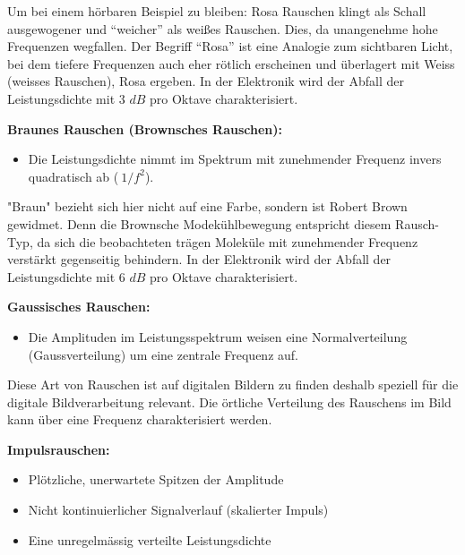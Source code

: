 Um bei einem hörbaren Beispiel zu bleiben: Rosa Rauschen klingt als Schall ausgewogener und ``weicher'' als weißes Rauschen. Dies, da unangenehme hohe Frequenzen wegfallen. Der Begriff ``Rosa'' ist eine Analogie zum sichtbaren Licht, bei dem tiefere Frequenzen auch eher rötlich erscheinen und überlagert mit Weiss (weisses Rauschen), Rosa ergeben. In der Elektronik wird der Abfall der Leistungsdichte mit 3 $ dB $ pro Oktave charakterisiert.

\begin{definition}{\bf Braunes Rauschen (Brownsches Rauschen):}
	\begin{itemize}
		\item Die Leistungsdichte nimmt im Spektrum mit zunehmender Frequenz invers quadratisch ab ($ ~1/f^2 $).
	\end{itemize}
\end{definition}


"Braun" bezieht sich hier nicht auf eine Farbe, sondern ist Robert Brown gewidmet. Denn die Brownsche Modekühlbewegung entspricht diesem Rausch-Typ, da sich die beobachteten trägen Moleküle mit zunehmender Frequenz verstärkt gegenseitig behindern. In der Elektronik wird der Abfall der Leistungsdichte mit 6 $ dB $ pro Oktave charakterisiert.


\begin{definition}{\bf Gaussisches Rauschen:}
	\begin{itemize}
		\item Die Amplituden im Leistungsspektrum weisen eine Normalverteilung (Gaussverteilung) um eine zentrale Frequenz auf.
	\end{itemize}
\end{definition}


Diese Art von Rauschen ist auf digitalen Bildern zu finden deshalb speziell für die digitale Bildverarbeitung relevant. Die örtliche Verteilung des Rauschens im Bild kann über eine Frequenz charakterisiert werden.


\begin{definition}{\bf Impulsrauschen:}
	\begin{itemize}
		\item Plötzliche, unerwartete Spitzen der Amplitude 
		\item Nicht kontinuierlicher Signalverlauf (skalierter Impuls)
		\item Eine unregelmässig verteilte Leistungsdichte
	\end{itemize}
\end{definition}


